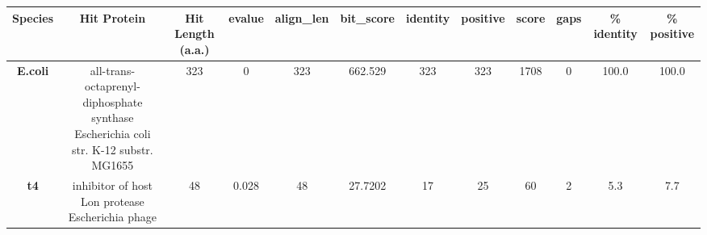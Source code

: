 \begin{tabular}{|c|c|c|c|c|c|c|c|c|c|c|c|} \hline
\textbf{Species} & \textbf{Hit Protein} & \textbf{Hit Length (a.a.)} & \textbf{evalue} & \textbf{align\_len} & \textbf{bit\_score} & \textbf{identity} & \textbf{positive} & \textbf{score} & \textbf{gaps} & \textbf{\% identity} & \textbf{\% positive} \\ \hline
\textbf{E.coli} & all-trans-octaprenyl-diphosphate synthase Escherichia coli str. K-12 substr. MG1655 & 323 & 0 & 323 & 662.529 & 323 & 323 & 1708 & 0 & 100.0 & 100.0\\
\textbf{t4} & inhibitor of host Lon protease Escherichia phage  & 48 & 0.028 & 48 & 27.7202 & 17 & 25 & 60 & 2 & 5.3 & 7.7\\
\hline \end{tabular}
